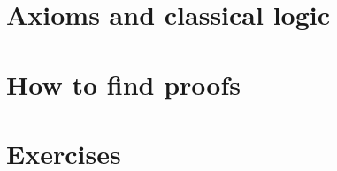 \documentclass{beamer}
\begin{document}
\section{Axioms and classical logic}


\section{How to find proofs}

\section{Exercises}
\end{document}
